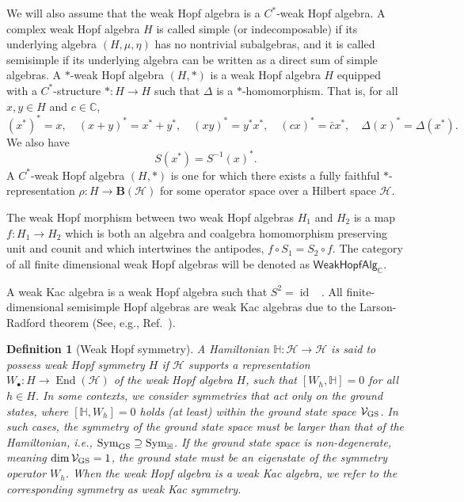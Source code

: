 \documentclass[a4paper,11pt]{article}
\theoremstyle{theorem}
\newtheorem{definition}{Definition}
\theoremstyle{remark}
\newcommand{\Cbb}{\mathbb{C}}
\newcommand{\id}{\operatorname{id}}
\begin{document}

We will also assume that the weak Hopf algebra is a \( C^* \)-weak Hopf algebra. A complex weak Hopf algebra \( H \) is called simple (or indecomposable) if its underlying algebra \( (H, \mu, \eta) \) has no nontrivial subalgebras, and it is called semisimple if its underlying algebra can be written as a direct sum of simple algebras. 
A \( * \)-weak Hopf algebra \( (H, *) \) is a weak Hopf algebra \( H \) equipped with a \( C^* \)-structure \( *: H \to H \) such that \( \Delta \) is a \( * \)-homomorphism. That is, for all \( x, y \in H \) and \( c \in \mathbb{C} \),
\begin{equation}
    (x^*)^* = x, \quad (x + y)^* = x^* + y^*, \quad (xy)^* = y^* x^*, \quad (c x)^* = \bar{c} x^*, \quad \Delta(x)^* = \Delta(x^*).
\end{equation}
We also have 
\begin{equation}
    S(x^*) = S^{-1}(x)^*.
\end{equation}
A \( C^* \)-weak Hopf algebra \( (H, *) \) is one for which there exists a fully faithful \( * \)-representation \( \rho: H \to \mathbf{B}(\mathcal{H}) \) for some operator space over a Hilbert space \( \mathcal{H} \).


The weak Hopf morphism between two weak Hopf algebras $H_1$ and $H_2$ is a map $f:H_1\to H_2$ which is both an algebra and coalgebra homomorphism preserving unit and counit and which intertwines the antipodes, $f\circ S_1= S_2 \circ f$. The category of all finite dimensional weak Hopf algebras will be denoted as $\mathsf{WeakHopfAlg}_{\Cbb}$.


A weak Kac algebra is a weak Hopf algebra such that \( S^2 = \id \) ~\cite{yamanouchi1994duality,bohm2000weakII}. All finite-dimensional semisimple Hopf algebras are weak Kac algebras due to the Larson-Radford theorem (See, e.g., Ref.~\cite{kassel2012quantum}).


\begin{definition}[Weak Hopf symmetry]   
A Hamiltonian \(\mathbb{H}: \mathcal{H} \to \mathcal{H}\) is said to possess weak Hopf symmetry \(H \) if \(\mathcal{H}\) supports a representation \(W_{\bullet}: H \to \operatorname{End}(\mathcal{H})\) of the weak Hopf algebra \(H\), such that \([W_h, \mathbb{H}] = 0\) for all \(h \in H\).
In some contexts, we consider symmetries that act only on the ground states, where \([\mathbb{H}, W_h] = 0\) holds (at least) within the ground state space \(\mathcal{V}_{\rm GS}\). 
In such cases, the symmetry of the ground state space must be larger than that of the Hamiltonian, i.e., \(\operatorname{Sym}_{\rm GS} \supseteq \operatorname{Sym}_{\mathbb{H}}\). 
If the ground state space is non-degenerate, meaning \(\dim \mathcal{V}_{\rm GS} = 1\), the ground state must be an eigenstate of the symmetry operator \(W_h\).
When the weak Hopf algebra is a weak Kac algebra, we refer to the corresponding symmetry as weak Kac symmetry.
\end{definition}
\end{document}
